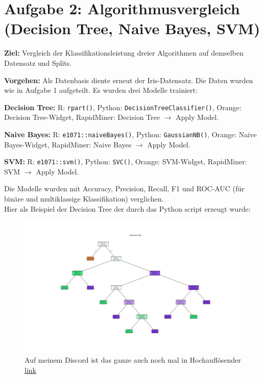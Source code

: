 \documentclass[a4paper,12pt]{scrartcl}
\begin{document}
\section*{Aufgabe 2: Algorithmusvergleich (Decision Tree, Naive Bayes, SVM)}

\textbf{Ziel:} Vergleich der Klassifikationsleistung dreier Algorithmen auf demselben Datensatz und Splits.\

\textbf{Vorgehen:} Als Datenbasis diente erneut der Iris-Datensatz. Die Daten wurden wie in Aufgabe 1 aufgeteilt. Es wurden drei Modelle trainiert:

\textbf{Decision Tree:} R: \lstinline|rpart()|, Python: \lstinline|DecisionTreeClassifier()|, Orange: Decision Tree-Widget, RapidMiner: Decision Tree $\to$ Apply Model.

\textbf{Naive Bayes:} R: \lstinline|e1071::naiveBayes()|, Python: \lstinline|GaussianNB()|, Orange: Naive Bayes-Widget, RapidMiner: Naive Bayes $\to$ Apply Model.

\textbf{SVM:} R: \lstinline|e1071::svm()|, Python: \lstinline|SVC()|, Orange: SVM-Widget, RapidMiner: SVM $\to$ Apply Model.

Die Modelle wurden mit Accuracy, Precision, Recall, F1 und ROC-AUC (für binäre und multiklassige Klassifikation) verglichen.\\
Hier als Beispiel der Decision Tree der durch das Python script erzeugt wurde:\\
\begin{figure}[htbp]
  \centering
  \includegraphics[scale=0.29]{Decision_tree.png}
  \caption{Auf meinem Discord ist das ganze auch noch mal in Hochauflösender \href{https://github.com/7hands/Angewandte-Modellierung-25-Colmant/blob/ec393fbadefd2cd1f55424f5d22f02f7f0c764c9/Assignment10/Tex/Decision_tree_py.svg}{link}}
\end{figure}
\end{document}
